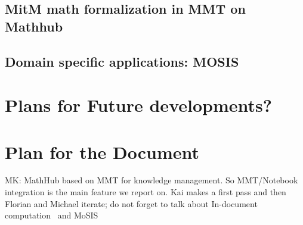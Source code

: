 \documentclass[book]{deliverablereport}
\begin{document}
\subsection{MitM math formalization in MMT on Mathhub}
\subsection{Domain specific applications: MOSIS}

\section{Plans for Future developments?}

\section{Plan for the Document}
MK: MathHub based on MMT for knowledge management. So MMT/Notebook integration is the main
feature we report on. Kai makes a first pass and then Florian and Michael iterate; do not
forget to talk about In-document computation~\cite{ODK-D4.9} and
MoSIS~\cite{PolKohKoe:kacse18}

\section{}

\printbibliography
\end{document}

